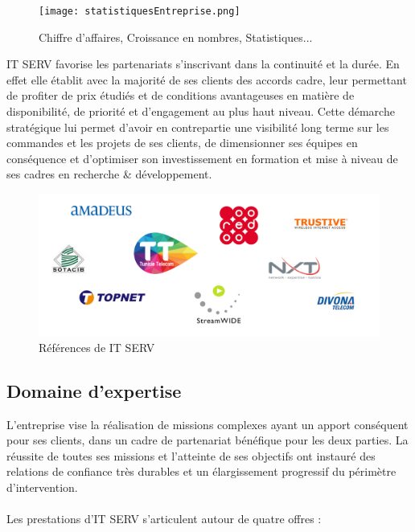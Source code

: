 \begin{spacing}{1.5}
\begin{figure}[h]
\centering
\texttt{[image: statistiquesEntreprise.png]}
\caption{Chiffre d'affaires, Croissance en nombres, Statistiques...}
\label{statistiquesCroissance}
\end{figure}

IT SERV favorise les partenariats s'inscrivant dans la continuité et la durée. En effet elle établit avec la majorité de ses clients des accords cadre, leur permettant de profiter de prix étudiés et de conditions avantageuses en matière de disponibilité, de priorité et d'engagement au plus haut niveau. Cette démarche stratégique lui permet d'avoir en contrepartie une visibilité long terme sur les commandes et les projets de ses clients, de dimensionner ses équipes en conséquence et d'optimiser son investissement en formation et mise à niveau de ses cadres en recherche \& développement.

\begin{figure}[!ht]
\centering
\includegraphics[scale=0.8]{references.png}
\caption{Références de IT SERV}
\label{fig:references}
\end{figure}

\subsection{Domaine d'expertise}
L'entreprise vise la réalisation de missions complexes ayant un apport conséquent pour ses clients, dans un cadre de partenariat bénéfique pour les deux parties. La réussite de toutes ses missions et l'atteinte de ses objectifs ont instauré des relations de confiance très durables et un élargissement progressif du périmètre d'intervention.\\
\\
Les prestations d'IT SERV s'articulent autour de quatre offres :

\end{spacing}
